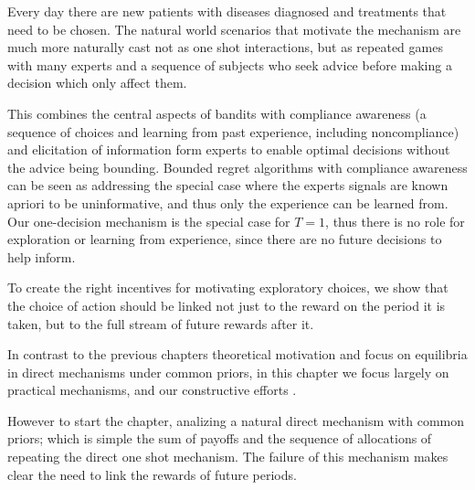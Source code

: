 



Every day there are new patients with diseases diagnosed and treatments that need to be chosen. 
The natural world scenarios that motivate the mechanism are much more naturally cast not as one shot interactions, but as repeated games with many experts and a sequence of subjects who seek advice before making a decision which only affect them.

This combines the central aspects of bandits with compliance awareness (a sequence of choices and learning from past experience, including noncompliance) and elicitation of information form experts to enable optimal decisions without the advice being bounding. 
Bounded regret algorithms with compliance awareness can be seen as addressing the special case where the experts signals are known apriori to be uninformative, and thus only the experience can be learned from. Our one-decision mechanism is the special case for $T={1}$, thus there is no role for exploration or learning from experience, since there are no future decisions  to help inform.

To create the right incentives for motivating exploratory choices, we show that the choice of action should be linked not just to the reward on the period it is taken, but to the full stream of future rewards after it. 

In contrast to the previous chapters theoretical motivation and focus on equilibria in direct mechanisms under common priors, in this chapter we focus largely on practical mechanisms, and our constructive efforts .

However to start the chapter, analizing a natural direct mechanism with common priors; which is simple the sum of payoffs and the sequence of allocations of repeating the direct one shot mechanism. The failure of this mechanism makes clear the need to link the rewards of future periods.


